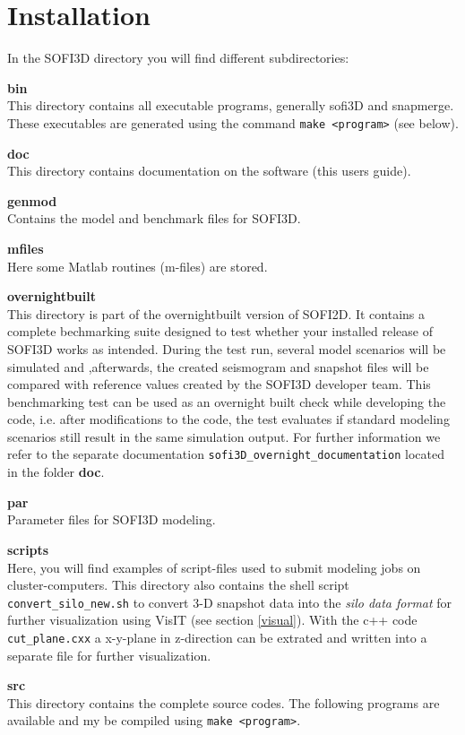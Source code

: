 \documentclass[11pt,onecolumn,oneside]{article}
\begin{document}
\section{Installation}
\label{installation}
In the SOFI3D directory you will find different subdirectories:

\textbf{bin}\\
This directory contains all executable programs, generally sofi3D and snapmerge. These executables are generated using the command  \lstinline{make <program>} (see below).

\textbf{doc}\\
This directory contains documentation on the software (this users guide).

\textbf{genmod}\\
Contains the model and benchmark files for SOFI3D.

\textbf{mfiles}\\
Here some Matlab routines (m-files) are stored. 

\textbf{overnightbuilt}\\
This directory is part of the overnightbuilt version of SOFI2D.
It contains a complete bechmarking suite designed to test whether your installed release of SOFI3D works as intended. During the test run, several model scenarios will be simulated and ,afterwards, the created seismogram and snapshot files will be compared with reference values created by the SOFI3D developer team. This benchmarking test can be used as an overnight built check while developing the code, i.e. after modifications to the code, the test evaluates if standard modeling scenarios still result in the same simulation output. For further information we refer to the separate documentation  \lstinline{sofi3D_overnight_documentation} located in the folder \textbf{doc}.

\textbf{par}\\
Parameter files for SOFI3D modeling.

\textbf{scripts}\\
Here, you will find examples of script-files used to submit modeling jobs on cluster-computers. This directory also contains the shell script  \lstinline{convert_silo_new.sh} to convert 3-D snapshot data into the \textit{silo data format} for further visualization using VisIT (see section \ref{visual}). With the c++ code  \lstinline{cut_plane.cxx} a x-y-plane in z-direction can be extrated and written into a separate file for further visualization.   

\textbf{src}\\
This directory contains the complete source codes.  The following programs are available and my be compiled using \lstinline{make <program>}.
\end{document}
